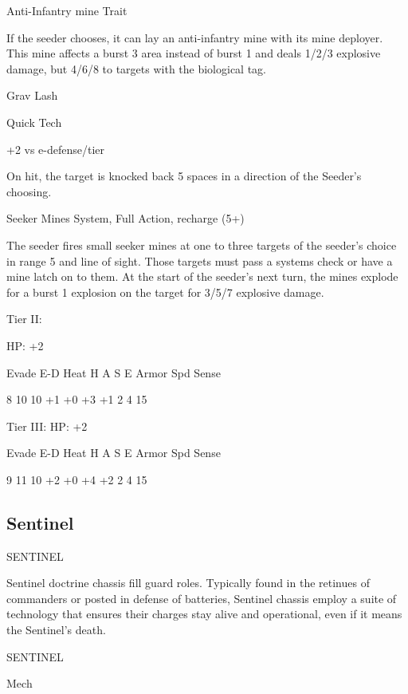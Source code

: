 Anti-Infantry mine  
Trait
 
If the seeder chooses, it can lay an anti-infantry mine with its mine deployer. This mine affects a  
burst 3 area instead of burst 1 and deals 1/2/3 explosive damage, but 4/6/8 to targets with the  
biological tag.
 

Grav Lash
 
Quick Tech
 
+2 vs e-defense/tier 
 
On hit, the target is knocked back 5 spaces in a direction of the Seeder’s choosing.
 

Seeker Mines  
System, Full Action, recharge (5+)
 
The seeder fires small seeker mines at one to three targets of the seeder’s choice in range 5 and  
line of sight. Those targets must pass a systems check or have a mine latch on to them. At the  
start of the seeder’s next turn, the mines explode for a burst 1 explosion on the target for 3/5/7  
explosive damage.
 

Tier II:
 
HP: +2
 

          Evade     E-D    Heat    H    A     S     E        Armor        Spd      Sense 

          8         10     10      +1    +0   +3    +1       2            4        15 

Tier III:  
HP: +2
 

          Evade     E-D    Heat    H    A     S     E        Armor        Spd      Sense 

          9         11     10      +2    +0   +4    +2       2            4        15 

                                                                                                                 
\subsection{Sentinel}

                                              SENTINEL  

Sentinel doctrine chassis fill guard roles. Typically found in the retinues of commanders or posted  
in defense of batteries, Sentinel chassis employ a suite of technology that ensures their charges  
stay alive and operational, even if it means the Sentinel’s death. 
 

 SENTINEL 

 Mech 

